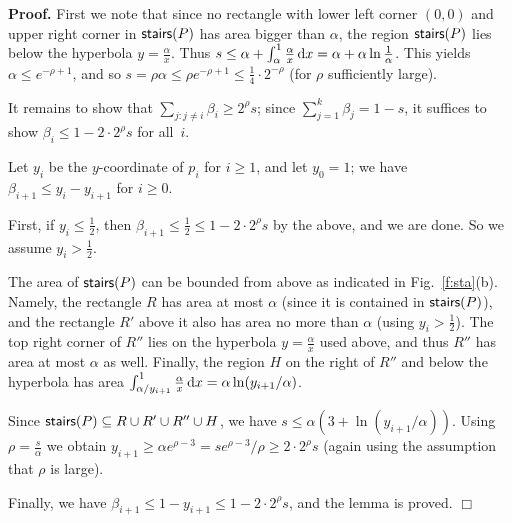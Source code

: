 \documentclass[11pt]{article}
\DeclareMathOperator{\stairs}{{\sf stairs}}
\newcommand{\qed}{\hspace{\stretch{1}}$\Box$}
\newenvironment{proof}{\vspace{-.25\baselineskip}\noindent\textbf{Proof.}
}{\qed\par\medskip}
\begin{document}
\begin{proof} First we note that 
since no rectangle with lower left corner $(0,0)$
and upper right corner in $\stairs(P)$ has area bigger than
$\alpha$, the region $\stairs(P)$ lies below the hyperbola
$y=\frac \alpha x$. Thus
$s\le \alpha+\int_{\alpha}^1\frac \alpha x\,{\rm d}x=\alpha+\alpha
\ln\frac 1\alpha$. This yields $\alpha\le e^{-\rho+1}$,
and so $s=\rho\alpha \le \rho e^{-\rho+1}\le \frac 14 \cdot 2^{-\rho}$
(for $\rho$ sufficiently large).


It remains to show that $\sum_{j:j\ne i}\beta_i \ge 2^\rho s$;
since $\sum_{j=1}^k\beta_j=1-s$, it suffices to show 
$\beta_i\le 1-2\cdot 2^\rho s$ for all~$i$.
 
Let $y_i$ be the $y$-coordinate of $p_i$ for $i \geq 1$, and let $y_{0} = 1$;
we have $\beta_{i + 1} \le y_{i}-y_{i+1}$ for $i \geq 0$. 

First, if $y_i\le\frac 12$, then $\beta_{i+1}\le
\frac 12\le 1-2\cdot 2^\rho s$ by the above, and 
we are done. So we assume $y_i>\frac 12$.

The area of $\stairs(P)$ can be bounded from above as indicated
in Fig.~\ref{f:sta}(b). Namely, the rectangle $R$ has area 
at most $\alpha$ (since it is contained in $\stairs(P)$), and
the rectangle $R'$ above it also has area no more than $\alpha$ 
(using $y_i>\frac 12$).  The top right corner of $R''$
lies on the hyperbola $y=\frac\alpha x$ used above, and thus $R''$
has area at most $\alpha$ as well. Finally, the region $H$
on the right of $R''$ and below the hyperbola has area
$\int_{\alpha/y_{i+1}}^1\frac\alpha x\,{\rm d}x =\alpha\ln(y_{i+1}/\alpha)$.





Since $\stairs(P)\subseteq R\cup R'\cup R''\cup H$, we 
have $s\le \alpha(3+\ln(y_{i+1}/\alpha))$. Using $\rho=\frac s\alpha$
we  obtain $y_{i+1}\ge \alpha e^{\rho-3}= se^{\rho-3}/\rho
\ge 2\cdot2^{\rho} s$ (again using the assumption that $\rho$ is large).

Finally, we have $\beta_{i+1}\le 1-y_{i+1}\le 1-2\cdot 2^\rho s$,
and the lemma is proved.
\end{proof}
\end{document}
